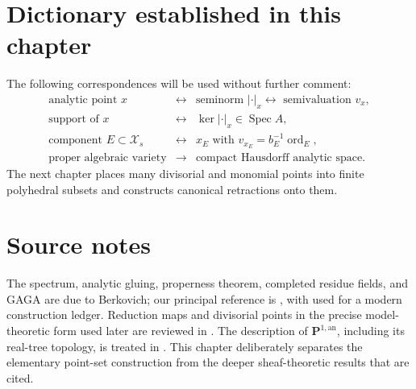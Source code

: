 \section{Dictionary established in this chapter}

The following correspondences will be used without further comment:
\[
\begin{array}{ccl}
\text{analytic point }x
 &\longleftrightarrow&
 \text{seminorm }|\cdot|_x
 \longleftrightarrow \text{ semivaluation }v_x,\\[1mm]
\text{support of }x
 &\longleftrightarrow&
 \ker|\cdot|_x\in\operatorname{Spec}A,\\[1mm]
\text{component }E\subset\mathcal X_s
 &\longleftrightarrow&
 x_E\text{ with }v_{x_E}=b_E^{-1}\operatorname{ord}_E,\\[1mm]
\text{proper algebraic variety}
 &\longrightarrow&
 \text{compact Hausdorff analytic space}.
\end{array}
\]
The next chapter places many divisorial and monomial points into finite
polyhedral subsets and constructs canonical retractions onto them.

\section*{Source notes}

The spectrum, analytic gluing, properness theorem, completed residue fields,
and GAGA are due to Berkovich; our principal reference is \cite{Berk12},
with \cite{Temkin2015Berkovich} used for a modern construction ledger.
Reduction maps and divisorial points in the precise model-theoretic form used
later are reviewed in \cite[Sections~2--3]{BFJ16}. The description of
$\mathbf P^{1,\mathrm{an}}$, including its real-tree topology, is treated
in \cite[Chapter~2]{BakerRumely2010}. This chapter deliberately separates the elementary
point-set construction from the deeper sheaf-theoretic results that are
cited.
